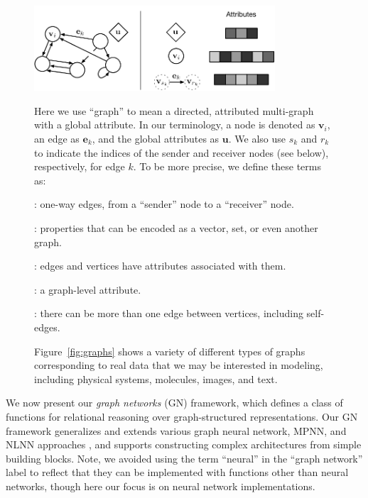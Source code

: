 \begin{figure}[t!]
\begin{infobox}
\begin{center}
\includegraphics[trim={0 -0.2cm 0 0.4cm},width=0.8\textwidth]{figures/attributes}
\end{center}

Here we use ``graph'' to mean a directed, attributed multi-graph with a global attribute.
In our terminology, a node is denoted as $\mathbf{v}_i$, an edge as $\mathbf{e}_k$, and the global attributes as $\mathbf{u}$.
We also use $s_k$ and $r_k$ to indicate the indices of the sender and receiver nodes (see below), respectively, for edge $k$.
To be more precise, we define these terms as:
\begin{description}[noitemsep]
\item[Directed]: one-way edges, from a ``sender'' node to a ``receiver'' node.
\item[Attribute]: properties that can be encoded as a vector, set, or even another graph.
\item[Attributed]: edges and vertices have attributes associated with them.
\item[Global attribute]: a graph-level attribute.
\item[Multi-graph]: there can be more than one edge between vertices, including self-edges.
\end{description}
Figure~\ref{fig:graphs} shows a variety of different types of graphs corresponding to real data that we may be interested in modeling, including physical systems, molecules, images, and text.
\label{box:graph}
\end{infobox}
\end{figure}

We now present our \emph{graph networks} (GN) framework, which defines a class of functions for relational reasoning over graph-structured representations. Our GN framework generalizes and extends various graph neural network, MPNN, and NLNN approaches \citep{scarselli2009computational,gilmer2017neural,wang2017non}, and supports constructing complex architectures from simple building blocks. Note, we avoided using the term ``neural'' in the ``graph network'' label to reflect that they can be implemented with functions other than neural networks, though here our focus is on neural network implementations.  

